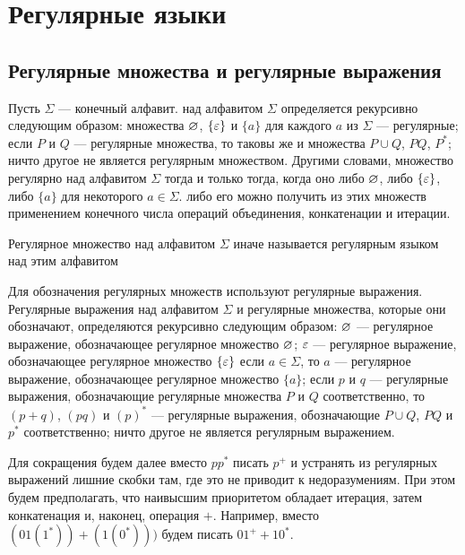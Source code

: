 \chapter{Регулярные языки}
\label{Chapter2}
\section{Регулярные множества и регулярные выражения}
\label{Chapter2RegExprs}

Пусть $\Sigma$ --- конечный алфавит.  над алфавитом
$\Sigma$ определяется рекурсивно следующим образом: множества $\varnothing$,
$\{\varepsilon\}$ и $\{a\}$ для каждого $a$ из $\Sigma$ --- регулярные; если $P$
и $Q$ --- регулярные множества, то таковы же и множества $P\cup Q$,
$PQ$, $P^*$; ничто другое не является регулярным множеством. Другими
словами, множество регулярно над алфавитом $\Sigma$ тогда и только
тогда, когда оно либо $\varnothing$, либо $\{\varepsilon\}$, либо $\{a\}$ для
некоторого $a\in\Sigma$. либо его можно получить из этих множеств
применением конечного числа операций объединения, конкатенации и
итерации.

Регулярное множество над алфавитом $\Sigma$ иначе называется регулярным языком над этим алфавитом

Для обозначения регулярных множеств используют регулярные выражения.
Регулярные выражения над алфавитом $\Sigma$ и регулярные множества,
которые они обозначают, определяются рекурсивно следующим образом:
$\varnothing$ --- регулярное выражение, обозначающее регулярное множество
$\varnothing$; $\varepsilon$ --- регулярное выражение, обозначающее регулярное
множество $\{\varepsilon\}$ если $a\in\Sigma$, то $a$ --- регулярное
выражение, обозначающее регулярное множество $\{a\}$; если $p$ и $q$ ---
регулярные выражения, обозначающие регулярные множества $P$ и $Q$
соответственно, то $(p+q)$, $(pq)$ и $(p)^*$ --- регулярные выражения,
обозначающие $P\cup Q$, $PQ$ и $p^*$ соответственно; ничто другое не
является регулярным выражением.

Для сокращения будем далее вместо $pp^*$ писать $p^+$ и устранять из регулярных выражений лишние скобки там, где это не приводит к недоразумениям. При этом будем предполагать, что наивысшим приоритетом обладает итерация, затем конкатенация и, наконец, операция $+$. Например, вместо $(01(1^*))+(1(0^*)))$ будем писать $01^++10^*$.

